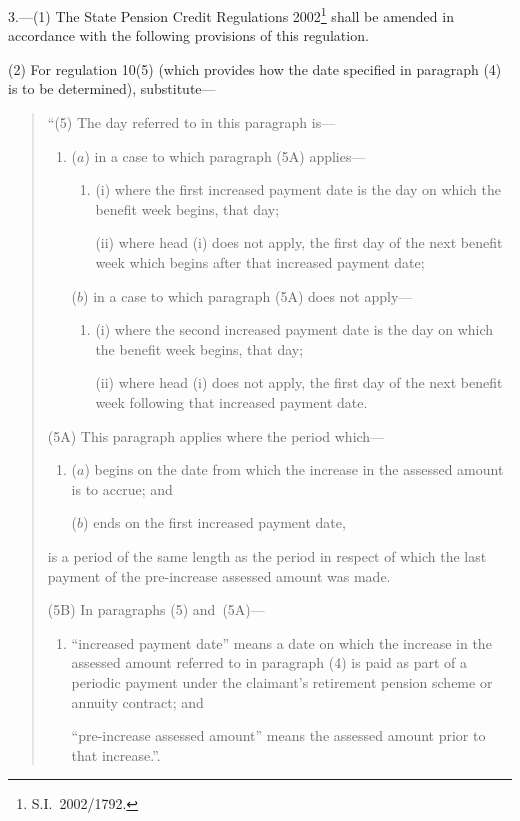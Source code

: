 \documentclass[12pt,a4paper]{article}
\begin{document}
3.---(1)  The State Pension Credit Regulations 2002\footnote{S.I.~2002/1792.} shall be amended in accordance with the following provisions of this regulation.

(2) For regulation 10(5) (which provides how the date specified in paragraph (4) is to be determined), substitute—
\begin{quotation}
“(5) The day referred to in this paragraph is—
\begin{enumerate}\item[]
($a$) in a case to which paragraph (5A) applies—
\begin{enumerate}\item[]
(i) where the first increased payment date is the day on which the benefit week begins, that day;

(ii) where head (i)  does not apply, the first day of the next benefit week which begins after that increased payment date;
\end{enumerate}

($b$) in a case to which paragraph (5A) does not apply—
\begin{enumerate}\item[]
(i) where the second increased payment date is the day on which the benefit week begins, that day;

(ii) where head (i)  does not apply, the first day of the next benefit week following that increased payment date.
\end{enumerate}
\end{enumerate}

(5A) This paragraph applies where the period which—
\begin{enumerate}\item[]
($a$) begins on the date from which the increase in the assessed amount is to accrue; and

($b$) ends on the first increased payment date,
\end{enumerate}
is a period of the same length as the period in respect of which the last payment of the pre-increase assessed amount was made.

(5B) In paragraphs (5) and~(5A)—
\begin{enumerate}\item[]
“increased payment date” means a date on which the increase in the assessed amount referred to in paragraph (4) is paid as part of a periodic payment under the claimant’s retirement pension scheme or annuity contract; and

“pre-increase assessed amount” means the assessed amount prior to that increase.”.
\end{enumerate}
\end{quotation}
\end{document}
